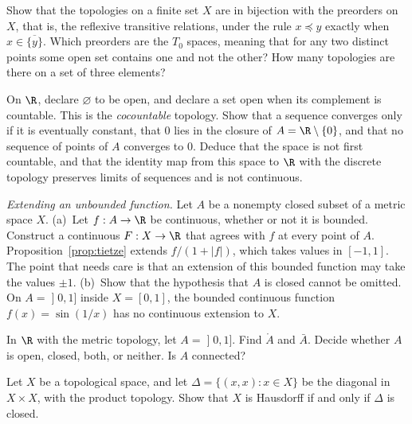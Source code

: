 \begin{exercise}[$\star\star$]\label{ex:finite}
Show that the topologies on a finite set $X$ are in bijection with the preorders on $X$, that is, the reflexive transitive relations, under the rule $x\preceq y$ exactly when $x\in\overline{\{y\}}$. Which preorders are the $T_0$ spaces, meaning that for any two distinct points some open set contains one and not the other? How many topologies are there on a set of three elements?
\end{exercise}

\begin{exercise}[$\star\star$]\label{ex:cocountable}
On $\R$, declare $\varnothing$ to be open, and declare a set open when its complement is countable. This is the \emph{cocountable} topology. Show that a sequence converges only if it is eventually constant, that $0$ lies in the closure of $A=\R\setminus\{0\}$, and that no sequence of points of $A$ converges to $0$. Deduce that the space is not first countable, and that the identity map from this space to $\R$ with the discrete topology preserves limits of sequences and is not continuous.
\end{exercise}

\begin{exercise}[$\star\star\star$]\label{ex:tietzeR}
\emph{Extending an unbounded function.} Let $A$ be a nonempty closed subset of a metric space $X$. (a)~Let $f:A\to\R$ be continuous, whether or not it is bounded. Construct a continuous $F:X\to\R$ that agrees with $f$ at every point of $A$. Proposition~\ref{prop:tietze} extends $f/(1+|f|)$, which takes values in $[-1,1]$. The point that needs care is that an extension of this bounded function may take the values $\pm1$. (b)~Show that the hypothesis that $A$ is closed cannot be omitted. On $A=\mathopen]0,1]$ inside $X=[0,1]$, the bounded continuous function $f(x)=\sin(1/x)$ has no continuous extension to $X$.
\end{exercise}

\begin{exercise}[$\star$]\label{ex:v7c03a}
In $\R$ with the metric topology, let $A=\mathopen]0,1]$. Find $\mathring A$ and $\bar A$. Decide whether $A$ is open, closed, both, or neither. Is $A$ connected?
\end{exercise}

\begin{exercise}[$\star\star$]\label{ex:v7c03b}
Let $X$ be a topological space, and let $\Delta=\{(x,x):x\in X\}$ be the diagonal in $X\times X$, with the product topology. Show that $X$ is Hausdorff if and only if $\Delta$ is closed.
\end{exercise}

